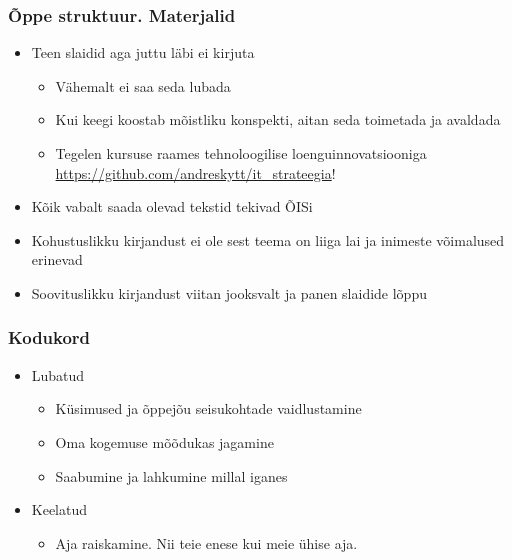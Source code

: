 \begin{frame}[fragile]
  \frametitle{Õppe struktuur. Materjalid}
	\begin{itemize}
		\item Teen slaidid aga juttu läbi ei kirjuta
		\begin{itemize}
			\item Vähemalt ei saa seda lubada
			\item Kui keegi koostab mõistliku konspekti, aitan seda toimetada ja avaldada
			\item Tegelen kursuse raames tehnoloogilise loenguinnovatsiooniga \url{https://github.com/andreskytt/it_strateegia}!
		\end{itemize}
		\item Kõik vabalt saada olevad tekstid tekivad ÕISi
		\item Kohustuslikku kirjandust ei ole sest teema on liiga lai ja inimeste võimalused erinevad
		\item Soovituslikku kirjandust viitan jooksvalt ja panen slaidide lõppu 
	\end{itemize}
\end{frame}


\begin{frame}[fragile]
  \frametitle{Kodukord}
	\begin{itemize}
		\item Lubatud
		\begin{itemize}
			\item Küsimused ja õppejõu seisukohtade vaidlustamine
			\item Oma kogemuse mõõdukas jagamine
			\item Saabumine ja lahkumine millal iganes
		\end{itemize}
		\item Keelatud
		\begin{itemize}
			\item Aja raiskamine. Nii teie enese kui meie ühise aja.
		\end{itemize}
	\end{itemize}
\end{frame}

